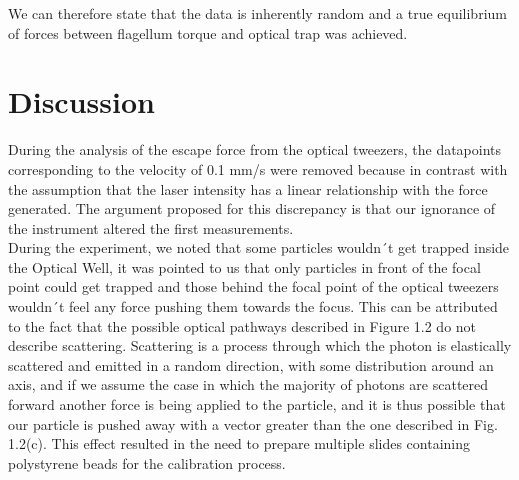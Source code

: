 \documentclass[a4paper,english,12pt,bibliography=totoc]{scrreprt}
\begin{document}
We can therefore state that the data is inherently random and a true equilibrium of forces between flagellum torque and optical trap was achieved.


\chapter{Discussion}
\label{cha:Discussion}



During the analysis of the escape force from the optical tweezers, the datapoints corresponding to the velocity of 0.1 mm/s were removed because in contrast with the assumption that the laser intensity has a linear relationship with the force generated. The argument proposed for this discrepancy is that our ignorance of the instrument altered the first measurements.\\



During the experiment, we noted that some particles wouldn´t get trapped inside the Optical Well, it was pointed to us that only particles in front of the focal point could get trapped and those behind the focal point of the optical tweezers wouldn´t feel any force pushing them towards the focus.
This can be attributed to the fact that the possible optical pathways described in Figure 1.2 do not describe scattering.
Scattering is a process through which the photon is elastically scattered and emitted in a random direction, with some distribution around an axis, and if we assume the case in which the majority of photons are scattered forward another force is being applied to the particle, and it is thus possible that our particle is pushed away with a vector greater than the one described in Fig. 1.2(c).
This effect resulted in the need to prepare multiple slides containing polystyrene beads for the calibration process.\\
\end{document}
